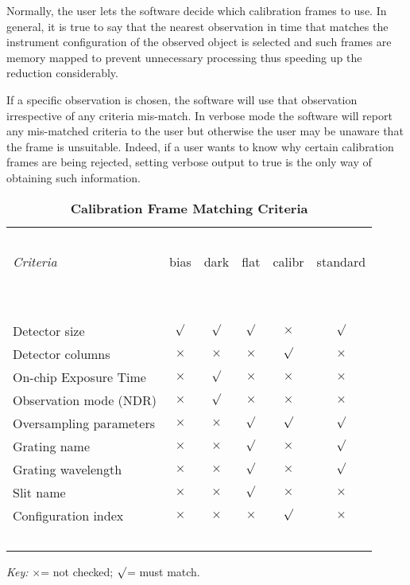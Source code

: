 \documentclass[a4paper]{book}
\renewcommand{\_}{{\tt\char'137}}
\newcommand{\cross}{$\times$}
\newcommand{\tick}{$\surd$}
\begin{document}
Normally, the user lets the software decide which calibration frames to
use. In general, it is true to say that the nearest observation in time
that matches the instrument configuration of the observed object is
selected and such frames are memory mapped to prevent unnecessary
processing thus speeding up the reduction considerably.

If a specific observation is chosen, the software will use that
observation irrespective of any criteria mis-match. In verbose mode the
software will report any mis-matched criteria to the user but otherwise
the user may be unaware that the frame is unsuitable. Indeed, if a user
wants to know why certain calibration frames are being rejected, setting
verbose output to {\sc true} is the only way of obtaining such
information.

\begin{table}
\begin{center}
\caption{\bf Calibration Frame Matching Criteria} \label{tab1}
\vglue 0.6cm
\begin{tabular}{|l|c|c|c|c|c|}
\hline
\ \ & \ \ & \ \ & \ \ & \ \ & \ \ \\
{\em Criteria} & {\sc bias} & {\sc dark} & {\sc flat} & {\sc calibr} & {\sc standard} \\
\ \ & \ \ & \ \ & \ \ & \ \ & \ \ \\
\hline
\ \ & \ \ & \ \ & \ \ & \ \ & \ \ \\
Detector size               & \tick   & \tick   & \tick   & \cross  & \tick  \\
Detector columns            & \cross  & \cross  & \cross  & \tick   & \cross \\
On-chip Exposure Time       & \cross  & \tick   & \cross  & \cross  & \cross \\
Observation mode (NDR)      & \cross  & \tick   & \cross  & \cross  & \cross \\
Oversampling parameters     & \cross  & \cross  & \tick   & \tick   & \tick  \\
Grating name                & \cross  & \cross  & \tick   & \cross  & \tick  \\
Grating wavelength          & \cross  & \cross  & \tick   & \cross  & \tick  \\
Slit name                   & \cross  & \cross  & \tick   & \cross  & \cross \\
Configuration index         & \cross  & \cross  & \cross  & \tick   & \cross \\
\ \ & \ \ & \ \ & \ \ & \ \ & \ \ \\
\hline
\end{tabular}
\vglue 0.3cm
{\em Key:} \cross = not checked; \tick = must match.
\end{center}
\end{table}
\end{document}
